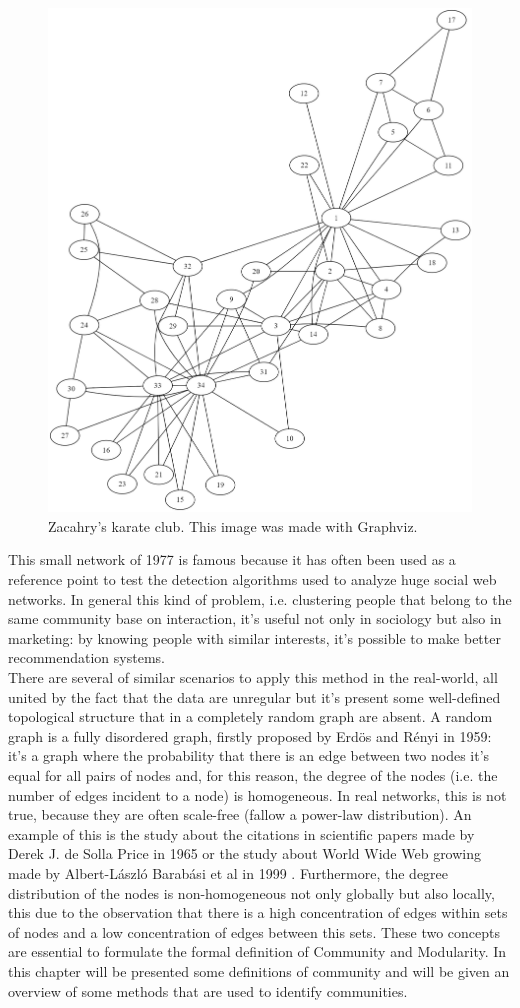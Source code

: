 \begin{figure}
	\centering
	\includegraphics[width=0.6\linewidth]{0-resources/karateclub}
	\caption{Zacahry's karate club. \cite{Zac77} This image was made with Graphviz.}
	\label{fig:karateclub}
\end{figure}
This small network of 1977 is famous because it has often been used as a reference point to test the detection algorithms used to analyze huge social web networks.
In general this kind of problem, i.e. clustering people that belong to the same community base on interaction, it's useful not only in sociology but also in marketing: by knowing people with similar interests, it's possible to make better recommendation systems.\\
There are several of similar scenarios to apply this method in the real-world, all united by the fact that the data are unregular but it's present some well-defined topological structure that in a completely random graph are absent. A random graph is a fully disordered graph, firstly proposed by Erdös and Rényi \cite{random} in 1959: it's a graph where the probability that there is an edge between two nodes it's equal for all pairs of nodes and, for this reason, the degree of the nodes (i.e. the number of edges incident to a node) is homogeneous. In real networks, this is not true, because they are often scale-free (fallow a power-law distribution). An example of this is the study about the citations in scientific papers made by Derek J. de Solla Price in 1965 \cite{dsp} or the study about World Wide Web growing made by Albert-László Barabási et al in 1999 \cite{Barab}.
Furthermore, the degree distribution of the nodes is non-homogeneous not only globally but also locally, this due to the observation that there is a high concentration of edges within sets of nodes and a low concentration of edges between this sets. These two concepts are essential to formulate the formal definition of Community and Modularity. In this chapter will be presented some definitions of community and will be given an overview of some methods that are used to identify communities.

